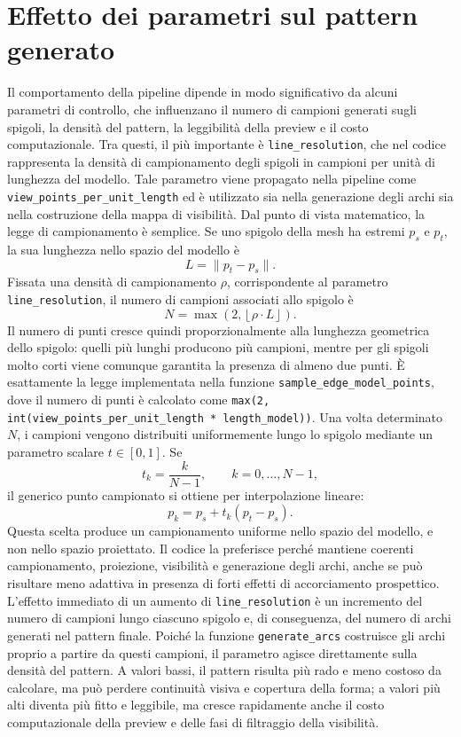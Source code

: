 \documentclass[a4paper,11pt,titlepage,twoside]{book}
\newcommand{\1}{\mathbf{1}}
\numberwithin{equation}{chapter}
\theoremstyle{plain}
\theoremstyle{definition}
\begin{document}
	\section{Effetto dei parametri sul pattern generato}
	
	Il comportamento della pipeline dipende in modo significativo da alcuni parametri di controllo, che influenzano il numero di campioni generati sugli spigoli, la densità del pattern, la leggibilità della preview e il costo computazionale. Tra questi, il più importante è \texttt{line\_resolution}, che nel codice rappresenta la densità di campionamento degli spigoli in campioni per unità di lunghezza del modello. Tale parametro viene propagato nella pipeline come \texttt{view\_points\_per\_unit\_length} ed è utilizzato sia nella generazione degli archi sia nella costruzione della mappa di visibilità.
	Dal punto di vista matematico, la legge di campionamento è semplice. Se uno spigolo della mesh ha estremi \(p_s\) e \(p_t\), la sua lunghezza nello spazio del modello è
	\[
	L = \|p_t - p_s\|.
	\]
	Fissata una densità di campionamento \(\rho\), corrispondente al parametro \texttt{line\_resolution}, il numero di campioni associati allo spigolo è
	\[
	N = \max\left(2,\left\lfloor \rho \cdot L \right\rfloor\right).
	\]
	Il numero di punti cresce quindi proporzionalmente alla lunghezza geometrica dello spigolo: quelli più lunghi producono più campioni, mentre per gli spigoli molto corti viene comunque garantita la presenza di almeno due punti. È esattamente la legge implementata nella funzione \texttt{sample\_edge\_model\_points}, dove il numero di punti è calcolato come \texttt{max(2, int(view\_points\_per\_unit\_length * length\_model))}.
	Una volta determinato \(N\), i campioni vengono distribuiti uniformemente lungo lo spigolo mediante un parametro scalare \(t \in [0,1]\). Se
	\[
	t_k = \frac{k}{N-1}, \qquad k = 0,\dots,N-1,
	\]
	il generico punto campionato si ottiene per interpolazione lineare:
	\[
	p_k = p_s + t_k (p_t - p_s).
	\]
	Questa scelta produce un campionamento uniforme nello spazio del modello, e non nello spazio proiettato. Il codice la preferisce perché mantiene coerenti campionamento, proiezione, visibilità e generazione degli archi, anche se può risultare meno adattiva in presenza di forti effetti di accorciamento prospettico.
	L’effetto immediato di un aumento di \texttt{line\_resolution} è un incremento del numero di campioni lungo ciascuno spigolo e, di conseguenza, del numero di archi generati nel pattern finale. Poiché la funzione \texttt{generate\_arcs} costruisce gli archi proprio a partire da questi campioni, il parametro agisce direttamente sulla densità del pattern. A valori bassi, il pattern risulta più rado e meno costoso da calcolare, ma può perdere continuità visiva e copertura della forma; a valori più alti diventa più fitto e leggibile, ma cresce rapidamente anche il costo computazionale della preview e delle fasi di filtraggio della visibilità.
\end{document}
